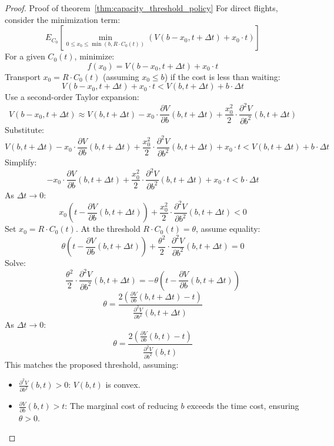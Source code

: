 \documentclass[opre,sglanonrev]{informs4}
\begin{document}
\begin{proof}{Proof of theorem~\ref{thm:capacity_threshold_policy}}
For direct flights, consider the minimization term:
\[
E_{C_0} \left[ \min_{0 \leq x_0 \leq \min(b, R \cdot C_0(t))} \left( V(b - x_0, t + \Delta t) + x_0 \cdot t \right) \right]
\]
For a given \( C_0(t) \), minimize:
\[
f(x_0) = V(b - x_0, t + \Delta t) + x_0 \cdot t
\]
Transport \( x_0 = R \cdot C_0(t) \) (assuming \( x_0 \leq b \)) if the cost is less than waiting:
\[
V(b - x_0, t + \Delta t) + x_0 \cdot t < V(b, t + \Delta t) + b \cdot \Delta t
\]
Use a second-order Taylor expansion:
\[
V(b - x_0, t + \Delta t) \approx V(b, t + \Delta t) - x_0 \cdot \frac{\partial V}{\partial b}(b, t + \Delta t) + \frac{x_0^2}{2} \cdot \frac{\partial^2 V}{\partial b^2}(b, t + \Delta t)
\]
Substitute:
\[
V(b, t + \Delta t) - x_0 \cdot \frac{\partial V}{\partial b}(b, t + \Delta t) + \frac{x_0^2}{2} \cdot \frac{\partial^2 V}{\partial b^2}(b, t + \Delta t) + x_0 \cdot t < V(b, t + \Delta t) + b \cdot \Delta t
\]
Simplify:
\[
-x_0 \cdot \frac{\partial V}{\partial b}(b, t + \Delta t) + \frac{x_0^2}{2} \cdot \frac{\partial^2 V}{\partial b^2}(b, t + \Delta t) + x_0 \cdot t < b \cdot \Delta t
\]
As \( \Delta t \to 0 \):
\[
x_0 \left( t - \frac{\partial V}{\partial b}(b, t + \Delta t) \right) + \frac{x_0^2}{2} \cdot \frac{\partial^2 V}{\partial b^2}(b, t + \Delta t) < 0
\]
Set \( x_0 = R \cdot C_0(t) \). At the threshold \( R \cdot C_0(t) = \theta \), assume equality:
\[
\theta \left( t - \frac{\partial V}{\partial b}(b, t + \Delta t) \right) + \frac{\theta^2}{2} \cdot \frac{\partial^2 V}{\partial b^2}(b, t + \Delta t) = 0
\]
Solve:
\[
\frac{\theta^2}{2} \cdot \frac{\partial^2 V}{\partial b^2}(b, t + \Delta t) = -\theta \left( t - \frac{\partial V}{\partial b}(b, t + \Delta t) \right)
\]
\[
\theta = \frac{2 \left( \frac{\partial V}{\partial b}(b, t + \Delta t) - t \right)}{\frac{\partial^2 V}{\partial b^2}(b, t + \Delta t)}
\]
As \( \Delta t \to 0 \):
\[
\theta = \frac{2 \left( \frac{\partial V}{\partial b}(b, t) - t \right)}{\frac{\partial^2 V}{\partial b^2}(b, t)}
\]
This matches the proposed threshold, assuming:
\begin{itemize}
    \item \( \frac{\partial^2 V}{\partial b^2}(b, t) > 0 \): \( V(b, t) \) is convex.
    \item \( \frac{\partial V}{\partial b}(b, t) > t \): The marginal cost of reducing \( b \) exceeds the time cost, ensuring \( \theta > 0 \).
\end{itemize}


\end{proof}
\end{document}
